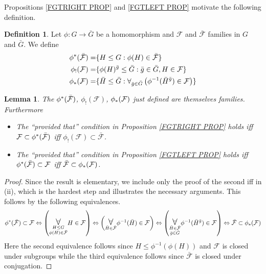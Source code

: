 \documentclass[a4paper,10pt
,draft
]{article}%
\numberwithin{equation}{section}
\numberwithin{figure}{section}
\newtheorem{lemma}[equation]{Lemma}%
\theoremstyle{definition} %
\newtheorem{definition}[equation]{Definition}%
\newcommand{\1}{\ensuremath{\mathbbm 1}}%
\begin{document}
Propositions \ref{FGTRIGHT PROP} and \ref{FGTLEFT PROP}
motivate the following definition.

\begin{definition}
	Let $\phi \colon G \to \bar{G}$ be a homomorphism and $\mathcal{F}$ and $\bar{\mathcal{F}}$ families in $G$
	and $\bar{G}$. We define
\begin{align}\label{PHISTARDEF EQ}
	\phi^{\**}(\bar{\mathcal{F}})
		=&
	\{H \leq G : \phi(H) \in \bar{\mathcal{F}}\}
\\
	\phi_!(\mathcal{F})
		=&
	\{\phi(H)^{\bar{g}}\leq \bar{G} : \bar{g} \in \bar{G}, H \in \mathcal{F}\}
\\ \label{PHISTARDEF3 EQ}
	\phi_{\**}(\mathcal{F})
		=&
	\{\bar{H} \leq \bar{G} : 
	\forall_{\bar{g} \in \bar{G}} 
	\left(
	\phi^{-1}(\bar{H}^{\bar{g}}) \in \mathcal{F}
	\right)\}
\end{align}
\end{definition}

\begin{lemma}\label{REWORFAM LEM}
The $\phi^{\**}(\bar{\mathcal{F}})$, $\phi_{!}(\mathcal{F})$, $\phi_{\**}(\mathcal{F})$ just defined are 
themselves families. Furthermore
\begin{itemize}
\item[(i)] The ``provided that'' condition in Proposition \ref{FGTRIGHT PROP} holds iff 
$\mathcal{F} \subset \phi^{\**} (\bar{\mathcal{F}})$
iff
$\phi_{!}(\mathcal{F}) \subset \bar{\mathcal{F}}$.
\item [(ii)]
The ``provided that'' condition in Proposition \ref{FGTLEFT PROP} holds iff 
$\phi^{\**} (\bar{\mathcal{F}}) \subset \mathcal{F}$
iff
$\bar{\mathcal{F}} \subset \phi_{\**}(\mathcal{F})$.
\end{itemize}
\end{lemma}


\begin{proof}
	Since the result is elementary, we include only the proof of the second iff in (ii), which is the hardest step and illustrates the necessary arguments. This follows by the following equivalences.
\[
	\phi^{\**} (\bar{\mathcal{F}}) \subset \mathcal{F}
\Leftrightarrow
	\left( \underset{ \substack{H \leq G \\ \phi(H) \in \bar{\mathcal{F}} }}{\mathlarger{\mathlarger{\forall}}} 
	H \in \mathcal{F} \right)
\Leftrightarrow
	\left( \underset{\bar{H} \in \bar{\mathcal{F}}}{\mathlarger{\mathlarger{\forall}}}
	\phi^{-1}(\bar{H}) \in \mathcal{F}
	\right)
\Leftrightarrow
	\left( \underset{ \substack{\bar{H} \in \bar{\mathcal{F}}\\\bar{g} \in \bar{G}}}{\mathlarger{\mathlarger{\forall}}}
	\phi^{-1}(\bar{H}^{\bar{g}}) \in \mathcal{F}
	\right)
\Leftrightarrow
        \bar{\mathcal F} \subset \phi_{\**}(\mathcal F)
\]
Here the second equivalence follows since 
$H \leq \phi^{-1}(\phi(H))$ and $\mathcal{F}$ is closed under subgroups while the third equivalence follows since 
$\bar{\mathcal{F}}$ is closed under conjugation. 
\end{proof}
\end{document}
